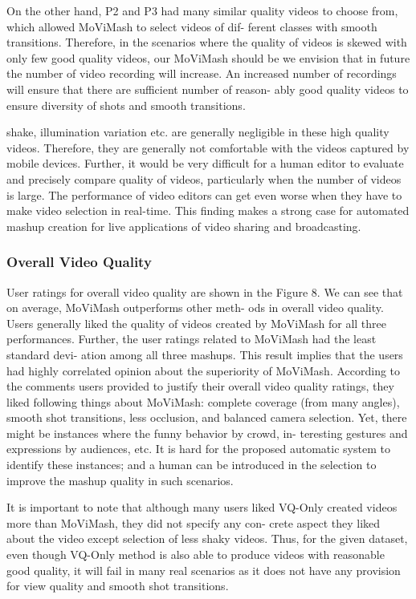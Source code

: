 \documentclass[conference]{IEEEtran}
\begin{document}
On the other hand, P2 and P3 had many similar quality videos
to choose from, which allowed MoViMash to select videos of dif-
ferent classes with smooth transitions. Therefore, in the scenarios
where the quality of videos is skewed with only few good quality
videos, our MoViMash should be we envision that in future the
number of video recording will increase. An increased number of
recordings will ensure that there are sufficient number of reason-
ably good quality videos to ensure diversity of shots and smooth
transitions.

shake, illumination variation etc. are generally negligible in these
high quality videos. Therefore, they are generally not comfortable
with the videos captured by mobile devices. Further, it would be
very difficult for a human editor to evaluate and precisely compare
quality of videos, particularly when the number of videos is large.
The performance of video editors can get even worse when they
have to make video selection in real-time. This finding makes a
strong case for automated mashup creation for live applications of
video sharing and broadcasting.


\subsubsection{Overall Video Quality}
User ratings for overall video quality are shown in the Figure 8.
We can see that on average, MoViMash outperforms other meth-
ods in overall video quality. Users generally liked the quality of
videos created by MoViMash for all three performances. Further,
the user ratings related to MoViMash had the least standard devi-
ation among all three mashups. This result implies that the users
had highly correlated opinion about the superiority of MoViMash.
According to the comments users provided to justify their overall
video quality ratings, they liked following things about MoViMash:
complete coverage (from many angles), smooth shot transitions,
less occlusion, and balanced camera selection. Yet, there might
be instances where the funny behavior by crowd, in-
teresting gestures and expressions by audiences, etc. It is hard for
the proposed automatic system to identify these instances; and a
human can be introduced in the selection to improve the mashup
quality in such scenarios.

It is important to note that although many users liked VQ-Only
created videos more than MoViMash, they did not specify any con-
crete aspect they liked about the video except selection of less
shaky videos. Thus, for the given dataset, even though VQ-Only
method is also able to produce videos with reasonable good quality,
it will fail in many real scenarios as it does not have any provision
for view quality and smooth shot transitions.
\end{document}
